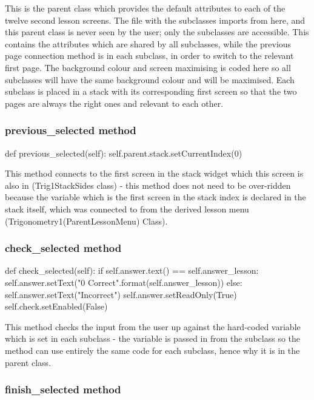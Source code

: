 This is the parent class which provides the default attributes to each of the twelve second lesson screens. The file with the subclasses imports from here, and this parent class is never seen by the user; only the subclasses are accessible. This contains the attributes which are shared by all subclasses, while the previous page connection method is in each subclass, in order to switch to the relevant first page. The background colour and screen maximising is coded here so all subclasses will have the same background colour and will be maximised. Each subclass is placed in a stack with its corresponding first screen so that the two pages are always the right ones and relevant to each other.

\subsubsection{previous\_selected method}

\begin{python}
def previous_selected(self):
        self.parent.stack.setCurrentIndex(0)
\end{python}

This method connects to the first screen in the stack widget which this screen is also in (Trig1StackSides class) - this method does not need to be over-ridden because the variable which is the first screen in the stack index is declared in the stack itself, which was connected to from the derived lesson menu (Trigonometry1(ParentLessonMenu) Class).
 
\subsubsection{check\_selected method}

\begin{python}
def check_selected(self):
        if self.answer.text() == self.answer_lesson:
            self.answer.setText("{0} Correct".format(self.answer_lesson))
        else:
            self.answer.setText("Incorrect")
        self.answer.setReadOnly(True)
        self.check.setEnabled(False)
\end{python}

This method checks the input from the user up against the hard-coded variable which is set in each subclass - the variable is passed in from the subclass so the method can use entirely the same code for each subclass, hence why it is in the parent class.

\subsubsection{finish\_selected method}

